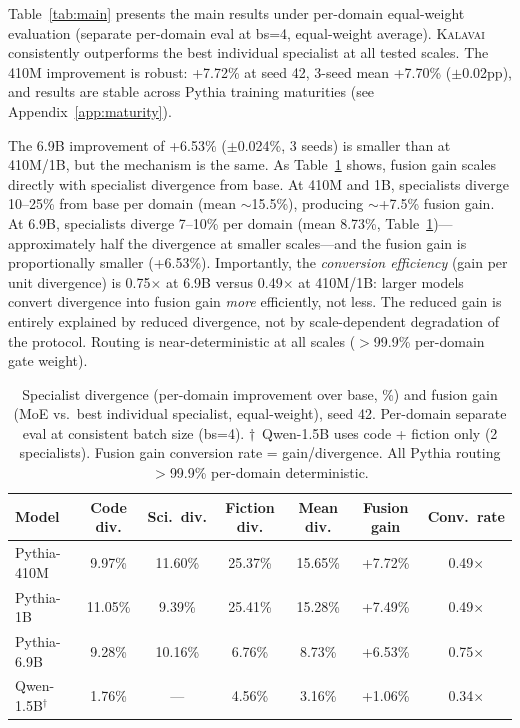 \documentclass{article}
\newcommand{\kalavai}{\textsc{Kalavai}\xspace}
\begin{document}
Table~\ref{tab:main} presents the main results under per-domain equal-weight evaluation (separate per-domain eval at bs=4, equal-weight average). \kalavai consistently outperforms the best individual specialist at all tested scales. The 410M improvement is robust: +7.72\% at seed 42, 3-seed mean +7.70\% ($\pm$0.02pp), and results are stable across Pythia training maturities (see Appendix~\ref{app:maturity}).

The 6.9B improvement of +6.53\% ($\pm$0.024\%, 3 seeds) is smaller than at 410M/1B, but the mechanism is the same. As Table~\ref{tab:divergence} shows, fusion gain scales directly with specialist divergence from base. At 410M and 1B, specialists diverge 10--25\% from base per domain (mean $\sim$15.5\%), producing $\sim$+7.5\% fusion gain. At 6.9B, specialists diverge 7--10\% per domain (mean 8.73\%, Table~\ref{tab:divergence})---approximately half the divergence at smaller scales---and the fusion gain is proportionally smaller (+6.53\%). Importantly, the \emph{conversion efficiency} (gain per unit divergence) is 0.75$\times$ at 6.9B versus 0.49$\times$ at 410M/1B: larger models convert divergence into fusion gain \emph{more} efficiently, not less. The reduced gain is entirely explained by reduced divergence, not by scale-dependent degradation of the protocol. Routing is near-deterministic at all scales ($>$99.9\% per-domain gate weight).

\begin{table}[h]
\centering
\caption{Specialist divergence (per-domain improvement over base, \%) and fusion gain (MoE vs.\ best individual specialist, equal-weight), seed 42. Per-domain separate eval at consistent batch size (bs=4). $\dagger$~Qwen-1.5B uses code + fiction only (2 specialists). Fusion gain conversion rate = gain/divergence. All Pythia routing $>$99.9\% per-domain deterministic.}
\label{tab:divergence}
\small
\begin{tabular}{lcccccc}
\toprule
\textbf{Model} & \textbf{Code div.} & \textbf{Sci.\ div.} & \textbf{Fiction div.} & \textbf{Mean div.} & \textbf{Fusion gain} & \textbf{Conv.\ rate} \\
\midrule
Pythia-410M         & 9.97\%  & 11.60\% & 25.37\% & 15.65\% & +7.72\% & 0.49$\times$ \\
Pythia-1B           & 11.05\% & 9.39\%  & 25.41\% & 15.28\% & +7.49\% & 0.49$\times$ \\
Pythia-6.9B         & 9.28\%  & 10.16\% & 6.76\%  & 8.73\%  & +6.53\% & 0.75$\times$ \\
Qwen-1.5B$^\dagger$ & 1.76\%  & ---     & 4.56\%  & 3.16\%  & +1.06\% & 0.34$\times$ \\
\bottomrule
\end{tabular}
\end{table}
\end{document}
